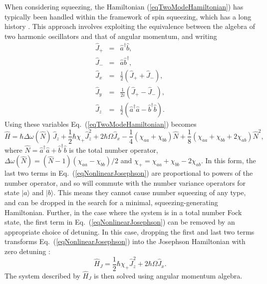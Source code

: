 \documentclass{iopart}
\begin{document}
When considering squeezing, the Hamiltonian (\ref{eqTwoModeHamiltonian}) has typically been handled within the framework of spin squeezing, which has a long history \cite{kitagawaET1993, esteve2008,sorensenET1999, liebfriedET2004, wineland1994, steel+collett}. This approach involves exploiting the equivalence between the algebra of two harmonic oscillators and that of angular momentum, and writing
\begin{eqnarray}
\hat{J}_+ &=& \hat{a}^{\dagger} \hat{b}, \\
\hat{J}_- &=& \hat{a} \hat{b}^{\dagger}, \\
\hat{J}_x &=& \frac{1}{2} \left( \hat{J}_+ + \hat{J}_-\right), \\
\hat{J}_y &=& \frac{1}{2i} \left( \hat{J}_+ - \hat{J}_-\right), \\
\hat{J}_z &=& \frac{1}{2} \left( \hat{a}^{\dagger} \hat{a} - \hat{b}^{\dagger} \hat{b} \right).
\end{eqnarray}
Using these variables Eq.~(\ref{eqTwoModeHamiltonian}) becomes
\begin{equation}
\hat{H} = \hbar\Delta \omega(\hat{N}) \, \hat{J}_z + \frac{1}{2}\hbar\chi_+ \hat{J}_z^2 + 2\hbar\Omega \hat{J}_x - \frac{1}{4}\left(\chi_{aa} + \chi_{bb}\right)\hat{N} + \frac{1}{8} \left(\chi_{aa} + \chi_{bb} + 2\chi_{ab}\right) \hat{N}^2,
\label{eqNonlinearJosephson}
\end{equation}
where $\hat{N}=\hat{a}^\dagger\hat{a} + \hat{b}^\dagger\hat{b}$ is the total number operator, $\Delta \omega(\hat{N}) = (\hat{N}-1)\left(\chi_{aa} - \chi_{bb}\right)/2$ and $\chi_+=\chi_{aa}+\chi_{bb}-2\chi_{ab}$. In this form, the last two terms in Eq.~(\ref{eqNonlinearJosephson}) are proportional to powers of the number operator, and so will commute with the number variance operators for state $|a\rangle$ and $|b\rangle$. This means they cannot cause number squeezing of any type, and can be dropped in the search for a minimal, squeezing-generating Hamiltonian. Further, in the case where the system is in a total number Fock state, the first term in Eq.~(\ref{eqNonlinearJosephson}) can be removed by an appropriate choice of detuning. In this case, dropping the first and last two terms transforms Eq.~(\ref{eqNonlinearJosephson}) into the Josephson Hamiltonian with zero detuning \cite{steel+collett}:
\begin{equation}
  \hat{H}_J = \frac{1}{2} \hbar\chi_+ \hat{J}_z^2 + 2\hbar \Omega \hat{J}_x. \label{eqJosephson}
\end{equation}
The system described by $\hat{H}_J$ is then solved using angular momentum algebra.
\end{document}
